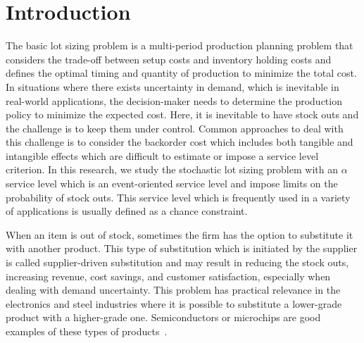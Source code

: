 \documentclass[11pt]{article}
\newcommand{\cred}{\color{black}}
\begin{document}
\section{Introduction}
\begin{comment}
{\cred



Contents of this section:

\begin{itemize}
    \item Lot sizing problem 
    \item Stochastic lot sizing problem with service levels
    \item Motivation on substitution
    \item Industrial relevance
    \item Motivation of stochastic lot sizing + random demand +joint service level + substitution 
    \item Industrial relevance
    \item Contributions of the work
\end{itemize}
}
\end{comment}
The basic lot sizing problem is a multi-period production planning problem that considers the trade-off between setup costs and inventory holding costs and defines the optimal timing and quantity of production to minimize the total cost. 
In situations where there exists uncertainty in demand, which is inevitable in real-world applications, the decision-maker needs to determine the production policy to minimize the expected cost. Here, it is inevitable to have stock outs and the challenge is to keep them under control. Common approaches to deal with this challenge is to consider the backorder cost which includes both tangible and intangible effects which are difficult to estimate or impose a service level criterion. 
In this research, we study the stochastic lot sizing problem with an $\alpha$ service level which is an event-oriented service level and impose limits on the probability of stock outs. This service level which is frequently used in a variety of applications is usually defined as a chance constraint. 

When an item is out of stock, sometimes the firm has the option to substitute it with another product. This type of substitution which is initiated by the supplier is called supplier-driven substitution and may result in reducing the stock outs, increasing revenue, cost savings, and customer satisfaction, especially when dealing with demand uncertainty. This problem has practical relevance in the electronics and steel industries where it is possible to substitute a lower-grade product with a higher-grade one. Semiconductors or microchips are good examples of these types of products~\cite{lang2010efficient}. 
\end{document}
